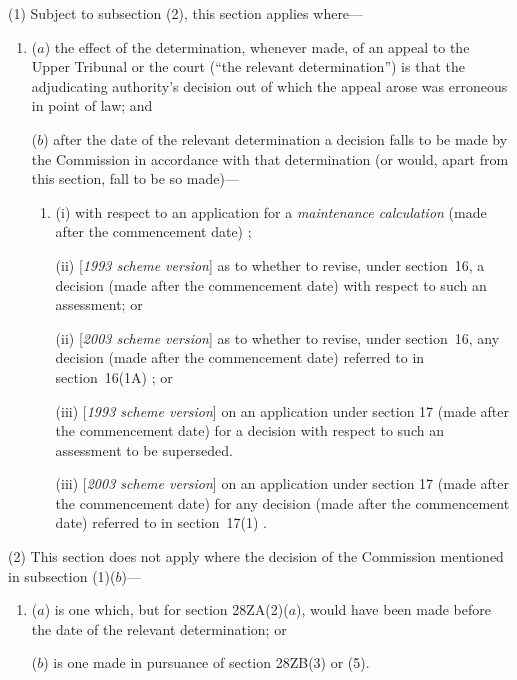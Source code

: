 \documentclass[12pt,a4paper]{article}
\begin{document}
(1) Subject to subsection (2), this section applies where—
\begin{enumerate}\item[]
($a$) the effect of the determination, whenever made, of an appeal to 
the Upper Tribunal   %
or the court (“the relevant determination”) is that the adjudicating authority’s decision out of which the appeal arose was erroneous in point of law; and

($b$) after the date of the relevant determination a decision falls to be made by the 
Commission  %
in accordance with that determination (or would, apart from this section, fall to be so made)—
\begin{enumerate}\item[]
(i) with respect to an application for a 
\emph{maintenance calculation}  %
(made after the commencement date)%
;

(ii) [\emph{1993 scheme version}] as to whether to revise, under section~16, a decision (made after the commencement date) with respect to such an assessment; or

(ii) [\emph{2003 scheme version}] as to whether to revise, under section~16, 
any decision (made after the commencement date) referred to in section~16(1A)%
; or

(iii) [\emph{1993 scheme version}] on an application under section 17 (made after the commencement date) for a decision with respect to such an assessment to be superseded.

(iii) [\emph{2003 scheme version}] on an application under section 17 (made after the commencement date) for 
any decision (made after the commencement date) referred to in section~17(1)%
.
\end{enumerate}
\end{enumerate}

(2) This section does not apply where the decision of the 
Commission  %
mentioned in subsection (1)($b$)—
\begin{enumerate}\item[]
($a$) is one which, but for section 28ZA(2)($a$), would have been made before the date of the relevant determination; or

($b$) is one made in pursuance of section 28ZB(3) or (5).
\end{enumerate}
\end{document}
